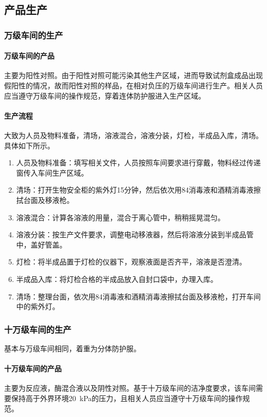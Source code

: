 \documentclass[cn,black,12pt,normal]{elegantnote}
\begin{document}
\subsection{产品生产}

\subsubsection{万级车间的生产}

\paragraph{万级车间的产品} 主要为阳性对照。由于阳性对照可能污染其他生产区域，进而导致试剂盒成品出现假阳性的情况，故而阳性对照的样品，在相对负压的万级车间进行生产。相关人员应当遵守万级车间的操作规范，穿着连体防护服进入生产区域。

\paragraph{生产流程} 大致为人员及物料准备，清场，溶液混合，溶液分装，灯检，半成品入库，清场。具体如下所示。
\begin{enumerate}
    \item 人员及物料准备：填写相关文件，人员按照车间要求进行穿戴，物料经过传递窗传入车间生产区域。
    \item 清场：打开生物安全柜的紫外灯15分钟，然后依次用84消毒液和酒精消毒液擦拭台面及移液枪。
    \item 溶液混合：计算各溶液的用量，混合于离心管中，稍稍摇晃混匀。
    \item 溶液分装：按生产文件要求，调整电动移液器，然后将溶液分装到半成品管中，盖好管盖。
    \item 灯检：将半成品置于灯检的仪器下，观察液面是否齐平，溶液是否澄清。
    \item 半成品入库：将灯检合格的半成品放入自封口袋中，办理入库。
    \item 清场：整理台面，依次用84消毒液和酒精消毒液擦拭台面及移液枪，打开车间中的紫外灯。
\end{enumerate}

\subsubsection{十万级车间的生产}

基本与万级车间相同，着重为分体防护服。

\paragraph{十万级车间的产品} 主要为反应液，酶混合液以及阴性对照。基于十万级车间的洁净度要求，该车间需要保持高于外界环境\SI{20}{\kilo\pascal}的压力，且相关人员应当遵守十万级车间的操作规范。
\end{document}
